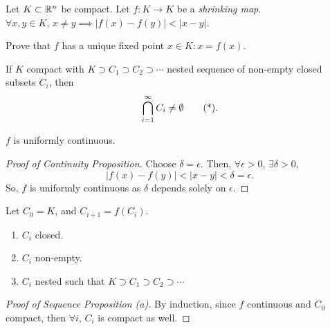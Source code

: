 \documentclass[../9extra]{subfiles}
\begin{document}
\begin{problem}[1]
Let $K\subset \mathbb{R}^{n}$ be compact.
Let $f:K\longrightarrow K$ be a \textit{shrinking map}.
$\forall x,y \in K,\, x \neq y \implies |f(x)-f(y)| < |x-y|$.

Prove that $f$ has a unique fixed point  $x \in K : x = f(x)$.
\end{problem}

If $K$ compact with  $K \supset C_1 \supset C_2 \supset \cdots$ nested sequence of non-empty closed subsets $C_i$, then \[
	\bigcap_{i=1}^{\infty} C_i \neq \emptyset \tag{*}
	.\]

\begin{proposition}
	$f$ is uniformly continuous.
\end{proposition}
\begin{proof}[Proof of Continuity Proposition]
	Choose $\delta = \epsilon$.
	Then, $\forall \epsilon>0,\, \exists \delta>0$, \[
		|f(x)-f(y)| < |x-y| < \delta = \epsilon
		.\]
	So, $f$ is uniformly continuous as  $\delta$ depends solely on  $\epsilon$.
\end{proof}

%
%

\begin{proposition}
	Let $C_0 = K$, and  $C_{i + 1} = f(C_i)$.
	\begin{enumerate}[label=(\alph*)]
		\item $C_i$ closed.
		\item $C_i$ non-empty.
		\item $C_i$ nested such that $K \supset C_1 \supset C_2 \supset \cdots$
	\end{enumerate}
\end{proposition}

\begin{proof}[Proof of Sequence Proposition (a)]
	By induction, since $f$ continuous and $C_0$ compact, then $\forall i$, $C_i$ is compact as well.
\end{proof}
\end{document}
